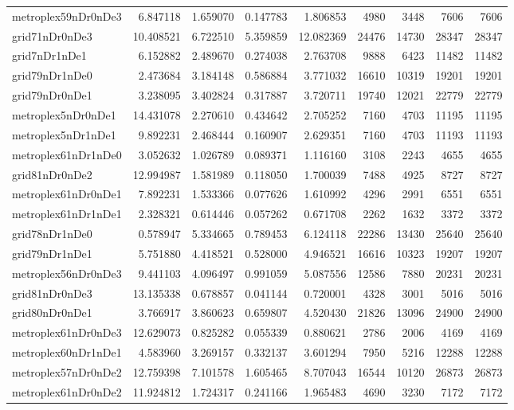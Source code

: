 \begin{longtable}{|l|r|r|r|r|r|r|r|r|}
metroplex59nDr0nDe3 & 6.847118 & 1.659070 & 0.147783 & 1.806853 & 4980 & 3448 & 7606 & 7606 \\
grid71nDr0nDe3 & 10.408521 & 6.722510 & 5.359859 & 12.082369 & 24476 & 14730 & 28347 & 28347 \\
grid7nDr1nDe1 & 6.152882 & 2.489670 & 0.274038 & 2.763708 & 9888 & 6423 & 11482 & 11482 \\
grid79nDr1nDe0 & 2.473684 & 3.184148 & 0.586884 & 3.771032 & 16610 & 10319 & 19201 & 19201 \\
grid79nDr0nDe1 & 3.238095 & 3.402824 & 0.317887 & 3.720711 & 19740 & 12021 & 22779 & 22779 \\
metroplex5nDr0nDe1 & 14.431078 & 2.270610 & 0.434642 & 2.705252 & 7160 & 4703 & 11195 & 11195 \\
metroplex5nDr1nDe1 & 9.892231 & 2.468444 & 0.160907 & 2.629351 & 7160 & 4703 & 11193 & 11193 \\
metroplex61nDr1nDe0 & 3.052632 & 1.026789 & 0.089371 & 1.116160 & 3108 & 2243 & 4655 & 4655 \\
grid81nDr0nDe2 & 12.994987 & 1.581989 & 0.118050 & 1.700039 & 7488 & 4925 & 8727 & 8727 \\
metroplex61nDr0nDe1 & 7.892231 & 1.533366 & 0.077626 & 1.610992 & 4296 & 2991 & 6551 & 6551 \\
metroplex61nDr1nDe1 & 2.328321 & 0.614446 & 0.057262 & 0.671708 & 2262 & 1632 & 3372 & 3372 \\
grid78nDr1nDe0 & 0.578947 & 5.334665 & 0.789453 & 6.124118 & 22286 & 13430 & 25640 & 25640 \\
grid79nDr1nDe1 & 5.751880 & 4.418521 & 0.528000 & 4.946521 & 16616 & 10323 & 19207 & 19207 \\
metroplex56nDr0nDe3 & 9.441103 & 4.096497 & 0.991059 & 5.087556 & 12586 & 7880 & 20231 & 20231 \\
grid81nDr0nDe3 & 13.135338 & 0.678857 & 0.041144 & 0.720001 & 4328 & 3001 & 5016 & 5016 \\
grid80nDr0nDe1 & 3.766917 & 3.860623 & 0.659807 & 4.520430 & 21826 & 13096 & 24900 & 24900 \\
metroplex61nDr0nDe3 & 12.629073 & 0.825282 & 0.055339 & 0.880621 & 2786 & 2006 & 4169 & 4169 \\
metroplex60nDr1nDe1 & 4.583960 & 3.269157 & 0.332137 & 3.601294 & 7950 & 5216 & 12288 & 12288 \\
metroplex57nDr0nDe2 & 12.759398 & 7.101578 & 1.605465 & 8.707043 & 16544 & 10120 & 26873 & 26873 \\
metroplex61nDr0nDe2 & 11.924812 & 1.724317 & 0.241166 & 1.965483 & 4690 & 3230 & 7172 & 7172 \\

\end{longtable}
